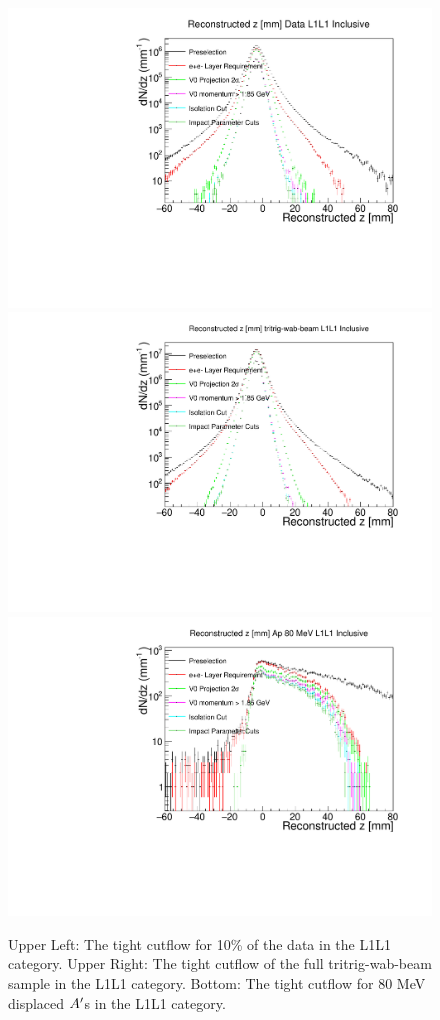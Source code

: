 

\begin{figure}[!ht] 
    \centering
    \includegraphics[width=.45\textwidth]{figs/selection/datatightcutflowL1L1_vz.pdf}
    \includegraphics[width=.45\textwidth]{figs/selection/mctightcutflowL1L1_vz.pdf}
    \includegraphics[width=.45\textwidth]{figs/selection/ap_80MeV_tightcutflowL1L1.pdf}
    \caption{
    	Upper Left: The tight cutflow for 10\% of the data in the L1L1 category. Upper Right: The tight cutflow of the full tritrig-wab-beam sample in the L1L1 category. Bottom: The tight cutflow for 80 MeV displaced $A^\prime$s in the L1L1 category. %
    }
    \label{fig:tightcutflow_L1L1}
\end{figure} 

